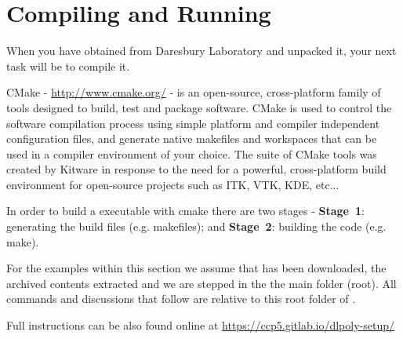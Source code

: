 \section{Compiling and Running \D}
\label{compilation}

When you have obtained \D from Daresbury Laboratory and unpacked it,
your next task will be to compile it.

CMake - \href{http://www.cmake.org/}{http://www.cmake.org/} - is
an open-source, cross-platform family of tools designed to build, test
and package software.  CMake is used to control the software compilation
process using simple platform and compiler independent configuration files,
and generate native makefiles and workspaces that can be used in a
compiler environment of your choice.  The suite of CMake tools was
created by Kitware in response to the need for a powerful, cross-platform
build environment for open-source projects such as ITK, VTK, KDE, etc...

In order to build a \D executable with cmake there are two stages -
{\bf Stage~1}: generating the build files (e.g. makefiles); and
{\bf Stage~2}: building the code (e.g. make).

For the examples within this section we assume that \D has been
downloaded, the archived contents extracted and we are stepped in the
the main folder (root).  All commands and discussions that follow are
relative to this root folder of \D.

Full instructions can be also found online at \url{https://ccp5.gitlab.io/dlpoly-setup/}

